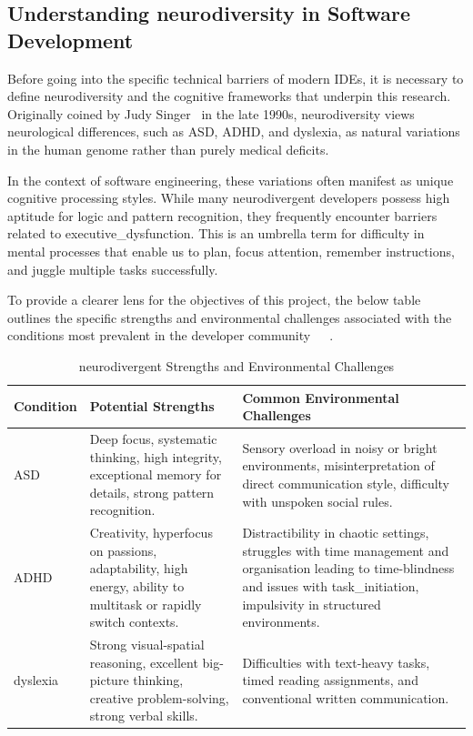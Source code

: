 \subsection{Understanding \Gls{neurodiversity} in Software Development}
Before going into the specific technical barriers of modern \glspl{IDE}, it is necessary to define \gls{neurodiversity} and the cognitive
 frameworks that underpin this research. Originally coined by Judy Singer~\cite{singer1999why} in the late 1990s, \gls{neurodiversity} views neurological differences, such 
 as \gls{ASD}, \gls{ADHD}, and \gls{dyslexia}, as natural variations in the human genome rather than purely medical deficits.

In the context of software engineering, these variations often manifest as unique cognitive processing styles. While many \gls{neurodivergent} 
developers possess high aptitude for logic and pattern recognition, they frequently encounter barriers related to \gls{executive_dysfunction}. 
This is an umbrella term for difficulty in mental processes that enable us to plan, focus attention, remember instructions, and juggle multiple tasks 
successfully.

To provide a clearer lens for the objectives of this project, the below table outlines the specific strengths and environmental challenges associated with the conditions most prevalent in the developer community~\cite{sperry2005perceptions}~\cite{hotte2024strengths}~\cite{roitsch2019overview}.
\begin{table}[H]
    \centering
    \caption{\Gls{neurodivergent} Strengths and Environmental Challenges}
    \renewcommand{\arraystretch}{1.5} %
    \begin{tabularx}{\textwidth}{l >{\raggedright\arraybackslash}X >{\raggedright\arraybackslash}X}
        \toprule
        \textbf{Condition} & \textbf{Potential Strengths} & \textbf{Common Environmental Challenges} \\
        \midrule
        \gls{ASD} & Deep focus, systematic thinking, high integrity, exceptional memory for details, strong pattern recognition. & Sensory overload in noisy or bright environments, misinterpretation of direct communication style, difficulty with unspoken social rules. \\
        \addlinespace
        \gls{ADHD} & Creativity, \gls{hyperfocus} on passions, adaptability, high energy, ability to multitask or rapidly switch contexts. & Distractibility in chaotic settings, struggles with time management and organisation leading to \gls{time-blindness} and issues with \gls{task_initiation}, impulsivity in structured environments.\\
        \addlinespace
        \Gls{dyslexia} & Strong visual-spatial reasoning, excellent big-picture thinking, creative problem-solving, strong verbal skills. & Difficulties with text-heavy tasks, timed reading assignments, and conventional written communication. \\
        \bottomrule
    \end{tabularx}
\end{table}

